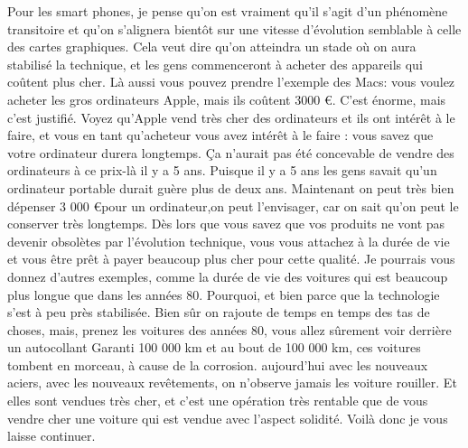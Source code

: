 \begin{small}
Pour les smart phones, je pense qu'on est vraiment qu'il s'agit d'un phénomène transitoire et qu'on s'alignera bientôt sur une vitesse d'évolution semblable à celle des cartes graphiques. Cela veut dire qu'on atteindra un stade où on aura stabilisé la technique, et les gens commenceront à acheter des appareils qui coûtent plus cher. Là aussi vous pouvez prendre l'exemple des Macs: vous voulez acheter les gros ordinateurs Apple, mais ils coûtent 3000 \euro. C'est énorme, mais c'est justifié. Voyez qu'Apple vend très cher des ordinateurs et ils ont intérêt à le faire, et vous en tant qu'acheteur vous avez intérêt à le faire : vous savez que votre ordinateur durera longtemps. Ça n'aurait pas été concevable de vendre des ordinateurs à ce prix-là il y a 5 ans. Puisque il y a 5 ans les gens savait qu'un ordinateur portable durait guère plus de deux ans. Maintenant on peut très bien dépenser 3 000 \euro pour un ordinateur,on peut l'envisager, car on sait qu'on peut le conserver très longtemps. Dès lors que vous savez que vos produits ne vont pas devenir obsolètes par l'évolution technique, vous vous attachez à la durée de vie et vous être prêt à payer beaucoup plus cher pour cette qualité. 
Je pourrais vous donnez d'autres exemples, comme la durée de vie des voitures qui est beaucoup plus longue que dans les années 80. Pourquoi, et bien parce que la technologie s'est à peu près stabilisée. Bien sûr on rajoute de temps en temps des tas de choses, mais, prenez les voitures des années 80, vous allez sûrement voir derrière un autocollant \og Garanti 100 000 km\fg{} et au bout de 100 000 km, ces voitures tombent en morceau, à cause de la corrosion. aujourd'hui avec les nouveaux aciers, avec les nouveaux revêtements, on n'observe jamais les voiture rouiller. Et elles sont vendues très cher, et c'est une opération très rentable que de vous vendre cher une voiture qui est vendue avec l'aspect solidité.
Voilà donc je vous laisse continuer.






\end{small}
